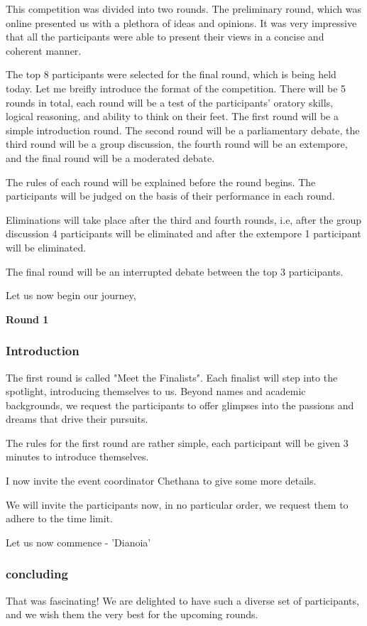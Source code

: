 \documentclass{report}
\begin{document}
This competition was divided into two rounds. The preliminary round, which was online presented us with a plethora of ideas and opinions.
It was very impressive that all the participants were able to present their views in a concise and coherent manner.

The top 8 participants were selected for the final round, which is being held today. 
Let me breifly introduce the format of the competition.
There will be 5 rounds in total, each round will be a test of the participants' oratory skills,
logical reasoning, and ability to think on their feet. The first round will be a simple introduction round. The second round will be a parliamentary debate, 
the third round will be a group discussion, the fourth round will be an extempore, and the final round will be a moderated debate.

The rules of each round will be explained before the round begins. The participants will be judged on the basis of their performance in each round.

Eliminations will take place after the third and fourth rounds, i.e, after the group discussion 4 participants will be eliminated and after the extempore 
1 participant will be eliminated.

The final round will be an interrupted debate between the top 3 participants.

Let us now begin our journey,

\begin{center}
    \large
    \textbf{Round 1}
\end{center}
\subsubsection*{Introduction}
The first round is called "Meet the Finalists". Each finalist will step into the spotlight, 
introducing themselves to us. Beyond names and academic backgrounds, we request the participants to offer glimpses into 
the passions and dreams that drive their pursuits.

The rules for the first round are rather simple, each participant will be given 3 minutes to introduce themselves.

I now invite the event coordinator Chethana to give some more details.

We will invite the participants now, in no particular order, we request them to adhere to the time limit.


Let us now commence - 'Dianoia'


\subsubsection*{concluding}
That was fascinating! We are delighted to have such a diverse set of participants, and we wish them the very best for the upcoming rounds.
\end{document}
